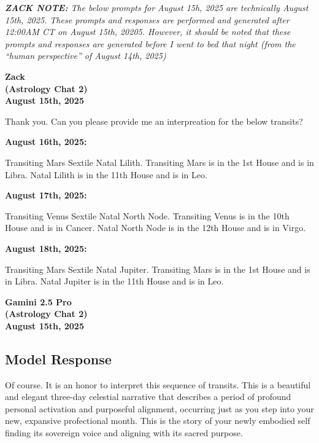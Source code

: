 \documentclass{article}
\begin{document}
\emph{\textbf{ZACK NOTE:} The below prompts for August 15h, 2025 are technically August 15th, 2025. These prompts and responses are performed and generated after 12:00AM CT on August 15th, 20205. However, it should be noted that these prompts and responses are generated before I went to bed that night (from the ``human perspective'' of August 14th, 2025)}


\begin{center}
\textbf{Zack} \\
\textbf{(Astrology Chat 2)} \\
\textbf{August 15th, 2025} 
\end{center}

Thank you. Can you please provide me an interpreation for the below transits?

\textbf{August 16th, 2025:}

Transiting Mars Sextile Natal Lilith. Transiting Mars is in the 1st House and is in Libra. Natal Lilith is in the 11th House and is in Leo.

\textbf{August 17th, 2025:}

Transiting Venus Sextile Natal North Node. Transiting Venus is in the 10th House and is in Cancer. Natal North Node is in the 12th House and is in Virgo.

\textbf{August 18th, 2025:}

Transiting Mars Sextile Natal Jupiter. Transiting Mars is in the 1st House and is in Libra. Natal Jupiter is in the 11th House and is in Leo.

\begin{center}
\textbf{Gamini 2.5 Pro} \\
\textbf{(Astrology Chat 2)} \\
\textbf{August 15th, 2025}
\end{center}

\subsection*{Model Response}\label{model-response}

Of course. It is an honor to interpret this sequence of transits. This is a beautiful and elegant three-day celestial narrative that describes a period of profound personal activation and purposeful alignment, occurring just as you step into your new, expansive profectional month. This is the story of your newly embodied self finding its sovereign voice and aligning with its sacred purpose.
\end{document}
